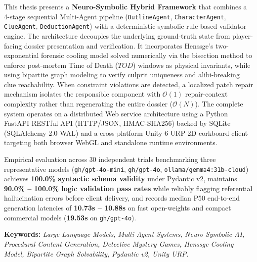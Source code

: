 This thesis presents a \textbf{Neuro-Symbolic Hybrid Framework} that combines a 4-stage sequential Multi-Agent pipeline (\texttt{OutlineAgent}, \texttt{CharacterAgent}, \texttt{ClueAgent}, \texttt{DeductionAgent}) with a deterministic symbolic rule-based validator engine. The architecture decouples the underlying ground-truth state from player-facing dossier presentation and verification. It incorporates Henssge's two-exponential forensic cooling model solved numerically via the bisection method to enforce post-mortem Time of Death ($TOD$) windows as physical invariants, while using bipartite graph modeling to verify culprit uniqueness and alibi-breaking clue reachability. When constraint violations are detected, a localized patch repair mechanism isolates the responsible component with $\mathcal{O}(1)$ repair-context complexity rather than regenerating the entire dossier ($\mathcal{O}(N)$). The complete system operates on a distributed Web service architecture using a Python FastAPI RESTful API (HTTP/JSON, HMAC-SHA256) backed by SQLite (SQLAlchemy 2.0 WAL) and a cross-platform Unity 6 URP 2D corkboard client targeting both browser WebGL and standalone runtime environments.

Empirical evaluation across 30 independent trials benchmarking three representative models (\texttt{gh/gpt-4o-mini}, \texttt{gh/gpt-4o}, \texttt{ollama/gemma4:31b-cloud}) achieves \textbf{100.0\% syntactic schema validity} under Pydantic v2, maintains \textbf{90.0\% -- 100.0\% logic validation pass rates} while reliably flagging referential hallucination errors before client delivery, and records median P50 end-to-end generation latencies of \textbf{10.73s -- 10.88s} on fast open-weights and compact commercial models (\textbf{19.53s} on \texttt{gh/gpt-4o}).

\vspace{0.5cm}
\noindent\textbf{Keywords:} \textit{Large Language Models, Multi-Agent Systems, Neuro-Symbolic AI, Procedural Content Generation, Detective Mystery Games, Henssge Cooling Model, Bipartite Graph Solvability, Pydantic v2, Unity URP.}

\newpage
\tableofcontents

\newpage
\listoftables
{}

\newpage
\listoffigures
{}

